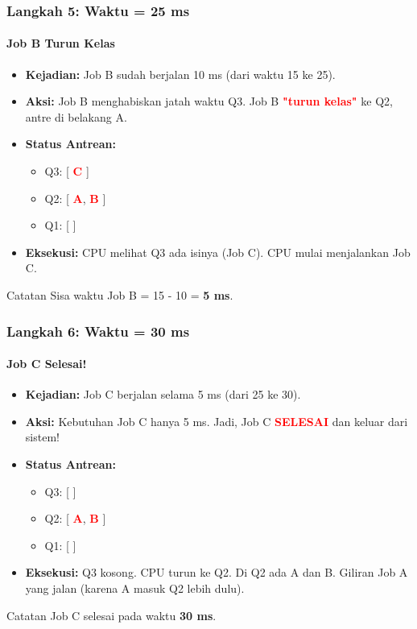 \documentclass[t,aspectratio=169,xcolor=dvipsnames]{beamer}
\newcommand{\tem}[1]{\textbf{\textcolor{red}{#1}}}
\begin{document}
\begin{frame}
    \frametitle{Langkah 5: Waktu = 25 ms}
    \framesubtitle{Job B Turun Kelas}
    \small
    \begin{itemize}
        \item \textbf{Kejadian:} Job B sudah berjalan 10 ms (dari waktu 15 ke 25).
        \item \textbf{Aksi:} Job B menghabiskan jatah waktu Q3. Job B \tem{"turun kelas"} ke Q2, antre di belakang A.
        \item \textbf{Status Antrean:}
        \begin{itemize}
            \item Q3: [ \tem{C} ]
            \item Q2: [ \tem{A}, \tem{B} ]
            \item Q1: [ ]
        \end{itemize}
        \item \textbf{Eksekusi:} CPU melihat Q3 ada isinya (Job C). CPU mulai menjalankan Job C.
    \end{itemize}
    \vspace{0.3cm}
    \begin{exampleblock}{Catatan}
        Sisa waktu Job B = 15 - 10 = \textbf{5 ms}.
    \end{exampleblock}
\end{frame}

\begin{frame}
    \frametitle{Langkah 6: Waktu = 30 ms}
    \framesubtitle{Job C Selesai!}
    \small
    \begin{itemize}
        \item \textbf{Kejadian:} Job C berjalan selama 5 ms (dari 25 ke 30).
        \item \textbf{Aksi:} Kebutuhan Job C hanya 5 ms. Jadi, Job C \tem{SELESAI} dan keluar dari sistem!
        \item \textbf{Status Antrean:}
        \begin{itemize}
            \item Q3: [ ]
            \item Q2: [ \tem{A}, \tem{B} ]
            \item Q1: [ ]
        \end{itemize}
        \item \textbf{Eksekusi:} Q3 kosong. CPU turun ke Q2. Di Q2 ada A dan B. Giliran Job A yang jalan (karena A masuk Q2 lebih dulu).
    \end{itemize}
    \vspace{0.3cm}
    \begin{exampleblock}{Catatan}
        Job C selesai pada waktu \textbf{30 ms}.
    \end{exampleblock}
\end{frame}
\end{document}
